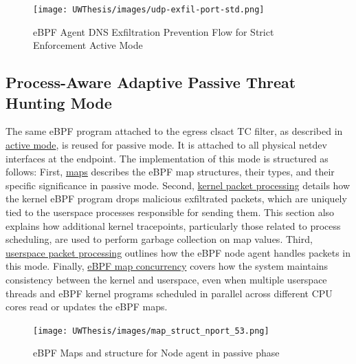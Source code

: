 \documentclass [11pt, proquest] {uwthesis}[2020/02/24]
\begin{document}
\label{sec:data_plane_standard_port}
\begin{figure}[H]
    \texttt{[image: UWThesis/images/udp-exfil-port-std.png]}
\caption{eBPF Agent DNS Exfiltration Prevention Flow for Strict Enforcement Active Mode}
\label{sec:dp-active-phase}
\end{figure}

\subsection{Process-Aware Adaptive Passive Threat Hunting Mode}
\label{sec:passive}
The same eBPF program attached to the egress clsact TC filter, as described in \hyperref[sec:active]{active mode}, is reused for passive mode. It is attached to all physical netdev interfaces at the endpoint. The implementation of this mode is structured as follows: First, \hyperref[sec:maps]{maps} describes the eBPF map structures, their types, and their specific significance in passive mode. Second, \hyperref[passive:sec1]{kernel packet processing} details how the kernel eBPF program drops malicious exfiltrated packets, which are uniquely tied to the userspace processes responsible for sending them. This section also explains how additional kernel tracepoints, particularly those related to process scheduling, are used to perform garbage collection on map values. Third, \hyperref[passive:sec2]{userspace packet processing} outlines how the eBPF node agent handles packets in this mode. Finally, \hyperref[passive:sec3]{eBPF map concurrency} covers how the system maintains consistency between the kernel and userspace, even when multiple userspace threads and eBPF kernel programs scheduled in parallel across different CPU cores read or updates the eBPF maps.


\begin{figure}[H]
\centering
\texttt{[image: UWThesis/images/map\_struct\_nport\_53.png]}
\caption{eBPF Maps and structure for Node agent in passive phase}
\label{sec:dp_eBPF_LRU_Maps_passive}
\end{figure}
\end{document}
